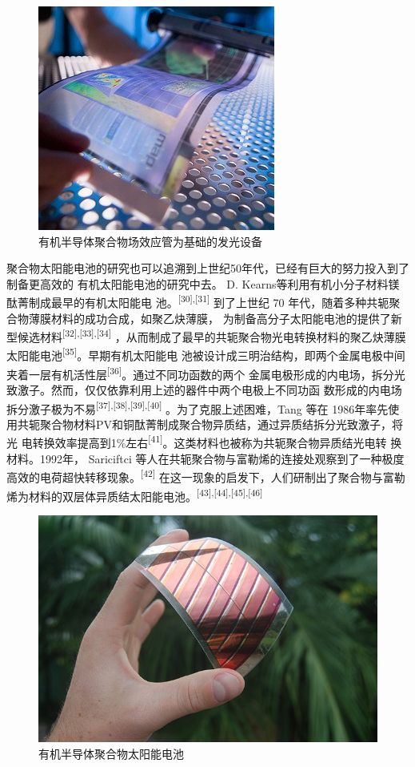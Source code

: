 \documentclass[12pt,]{report}
\begin{document}
\begin{figure}[h!]
    \centering
    \includegraphics[scale=0.6]{./figures/ofet.jpg}
    \caption{有机半导体聚合物场效应管为基础的发光设备}
    \label{fig:ofet}
\end{figure}

聚合物太阳能电池的研究也可以追溯到上世纪50年代，已经有巨大的努力投入到了制备更高效的
有机太阳能电池的研究中去。 D.
Kearns等利用有机小分子材料镁酞菁制成最早的有机太阳能电
池。\textsuperscript{{[}30{]},{[}31{]}} 到了上世纪 70
年代，随着多种共轭聚合物薄膜材料的成功合成，如聚乙炔薄膜，
为制备高分子太阳能电池的提供了新型候选材料\textsuperscript{{[}32{]},{[}33{]},{[}34{]}}
，从而制成了最早的共轭聚合物光电转换材料的聚乙炔薄膜太阳能电池\textsuperscript{{[}35{]}}。早期有机太阳能电
池被设计成三明治结构，即两个金属电极中间夹着一层有机活性层\textsuperscript{{[}36{]}}。通过不同功函数的两个
金属电极形成的内电场，拆分光致激子。然而，仅仅依靠利用上述的器件中两个电极上不同功函
数形成的内电场拆分激子极为不易\textsuperscript{{[}37{]},{[}38{]},{[}39{]},{[}40{]}}
。为了克服上述困难，Tang 等在
1986年率先使用共轭聚合物材料PV和铜酞菁制成聚合物异质结，通过异质结拆分光致激子，将光
电转换效率提高到1\%左右\textsuperscript{{[}41{]}}。这类材料也被称为共轭聚合物异质结光电转
换材料。1992年， Sariciftci
等人在共轭聚合物与富勒烯的连接处观察到了一种极度高效的电荷超快转移现象。\textsuperscript{{[}42{]}}
在这一现象的启发下，人们研制出了聚合物与富勒烯为材料的双层体异质结太阳能电池。\textsuperscript{{[}43{]},{[}44{]},{[}45{]},{[}46{]}}

\begin{figure}[h!]
    \centering
    \includegraphics[scale=0.5]{./figures/solarcell.jpg}
    \caption{有机半导体聚合物太阳能电池}
    \label{fig:solarcell}
\end{figure}
\end{document}
